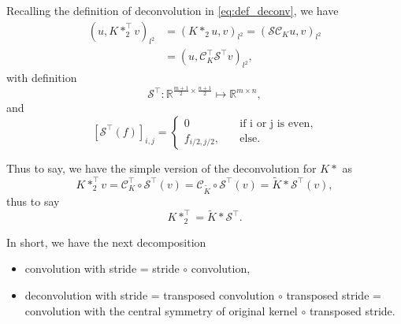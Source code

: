 Recalling the definition of deconvolution in \eqref{eq:def_deconv}, we have
\begin{equation}\label{eq:op_deconv}
\begin{aligned}
(u,  K \ast_2^\top v)_{l^2} &= (K \ast_2 u, v)_{l^2} = (\mathcal S \mathcal C_K u, v)_{l^2} \\
&= (u,  \mathcal C^\top_K \mathcal S^\top v)_{l^2},
\end{aligned}
\end{equation}
with definition
\begin{equation}\label{eq:de_stride_dim}
\mathcal S^\top:   \mathbb{R}^{\frac{m+1}{2} \times\frac{n+1}{2}} \mapsto \mathbb{R}^{m\times n},
\end{equation}
and 
\begin{equation}\label{eq:de_stride}
[\mathcal S^\top (f)]_{i,j} = 
\begin{cases}
0 \quad &\text{if i or j is even}, \\
f_{i/2, j/2}, \quad &\text{else}.
\end{cases}
\end{equation}

Thus to say, we have the simple version of the deconvolution for $K \ast $ as
\begin{equation}\label{eq:simple_deconv}
K \ast_2^\top v = \mathcal C_K^\top \circ \mathcal S^\top (v) = \mathcal C_{\tilde K} \circ \mathcal S^\top (v) = \tilde K \ast \mathcal S^\top (v),
\end{equation}
thus to say
\begin{equation}\label{eq:final}
K \ast_2^\top  = \tilde K \ast \mathcal S^\top.
\end{equation}

In short, we have the next decomposition
\begin{itemize}
	\item convolution with stride = stride $ \circ$ convolution,
	\item deconvolution with stride  = transposed convolution $\circ$ transposed stride = convolution with the central symmetry of original kernel $\circ$ transposed stride.
\end{itemize}

